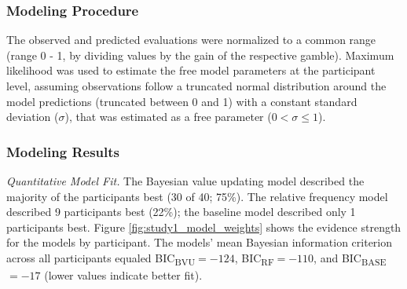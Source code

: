 \documentclass[a4paper, man, floatsintext]{apa6}
\begin{document}
\subsubsection{Modeling Procedure}

The observed and predicted evaluations were normalized to a common range
(range 0 - 1, by dividing values by the gain of the respective gamble).
Maximum likelihood was used to estimate the free model parameters at the
participant level, assuming observations follow a truncated normal
distribution around the model predictions (truncated between 0 and 1)
with a constant standard deviation (\(\sigma\)), that was estimated as a
free parameter (\(0 < \sigma \leq 1\)).

\subsubsection{Modeling Results}

\textit{Quantitative Model Fit.} The Bayesian value updating model
described the majority of the participants best (30 of 40; 75\%). The
relative frequency model described 9 participants best (22\%); the
baseline model described only 1 participants best. Figure
\ref{fig:study1_model_weights} shows the evidence strength for the
models by participant. The models' mean Bayesian information criterion
across all participants equaled BIC\textsubscript{BVU}\(= -124\),
BIC\textsubscript{RF}\(= -110\), and BIC\textsubscript{BASE}\(= -17\)
(lower values indicate better fit).
\end{document}

